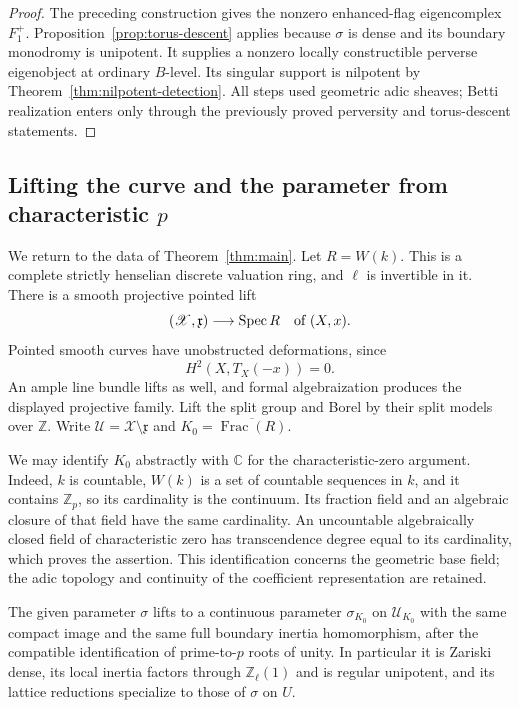 \begin{proof}
The preceding construction gives the nonzero enhanced-flag
eigencomplex $F_1^+$.  Proposition~\ref{prop:torus-descent} applies
because $\sigma$ is dense and its boundary monodromy is unipotent.
It supplies a nonzero locally constructible perverse eigenobject at
ordinary $B$-level.  Its singular support is nilpotent by
Theorem~\ref{thm:nilpotent-detection}.  All steps used geometric adic
sheaves; Betti realization enters only through the previously proved
perversity and torus-descent statements.
\end{proof}

\subsection{Lifting the curve and the parameter from characteristic
\texorpdfstring{$p$}{p}}

We return to the data of Theorem~\ref{thm:main}.  Let $R=W(k)$.
This is a complete strictly henselian discrete valuation ring, and
$\ell$ is invertible in it.  There is a smooth projective pointed lift
\[
 (\mathscr X,\mathfrak x)\longrightarrow\operatorname{Spec} R
 \quad\text{of }(X,x).
\]
Pointed smooth curves have unobstructed deformations, since
\[
                       H^2(X,T_X(-x))=0.
\]
An ample line bundle lifts as well, and formal algebraization produces the displayed projective
family.  Lift the split group and Borel by their split models over
$\mathbb Z$.  Write $\mathscr U=\mathscr X\setminus\mathfrak x$ and
$K_0=\overline{\operatorname{Frac}(R)}$.

We may identify $K_0$ abstractly with $\mathbb C$ for the
characteristic-zero argument.  Indeed, $k$ is countable,
$W(k)$ is a set of countable sequences in $k$, and it contains
$\mathbb Z_p$, so its cardinality is the continuum.  Its fraction
field and an algebraic closure of that field have the same cardinality.
An uncountable algebraically
closed field of characteristic zero has transcendence degree equal
to its cardinality, which proves the assertion.  This identification
concerns the geometric base field; the adic topology and continuity
of the coefficient representation are retained.

\begin{lemma}\label{lem:construction-mixed-parameter}
The given parameter $\sigma$ lifts to a continuous parameter
$\sigma_{K_0}$ on $\mathscr U_{K_0}$ with the same compact image and
the same full boundary inertia homomorphism, after the compatible
identification of prime-to-$p$ roots of unity.  In particular it is
Zariski dense, its local inertia factors through $\mathbb Z_\ell(1)$
and is regular unipotent, and its lattice reductions specialize to
those of $\sigma$ on $U$.
\end{lemma}

